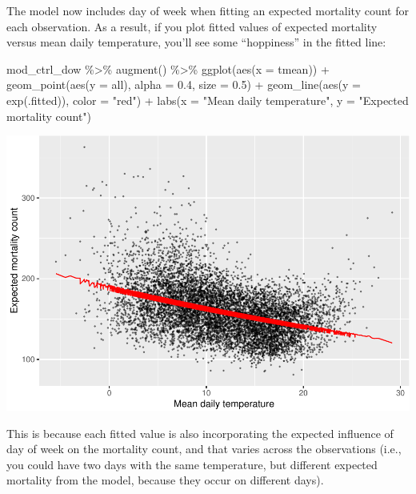 \documentclass[
]{book}
\newenvironment{Shaded}{\begin{snugshade}}{\end{snugshade}}
\newcommand{\AttributeTok}[1]{\textcolor[rgb]{0.77,0.63,0.00}{#1}}
\newcommand{\FloatTok}[1]{\textcolor[rgb]{0.00,0.00,0.81}{#1}}
\newcommand{\FunctionTok}[1]{\textcolor[rgb]{0.00,0.00,0.00}{#1}}
\newcommand{\NormalTok}[1]{#1}
\newcommand{\SpecialCharTok}[1]{\textcolor[rgb]{0.00,0.00,0.00}{#1}}
\newcommand{\StringTok}[1]{\textcolor[rgb]{0.31,0.60,0.02}{#1}}
\begin{document}
The model now includes day of week when fitting an expected mortality count
for each observation. As a result, if you plot fitted values of expected
mortality versus mean daily temperature, you'll see some ``hoppiness'' in the
fitted line:

\begin{Shaded}
\begin{Highlighting}[]
\NormalTok{mod\_ctrl\_dow }\SpecialCharTok{\%\textgreater{}\%} 
  \FunctionTok{augment}\NormalTok{() }\SpecialCharTok{\%\textgreater{}\%} 
  \FunctionTok{ggplot}\NormalTok{(}\FunctionTok{aes}\NormalTok{(}\AttributeTok{x =}\NormalTok{ tmean)) }\SpecialCharTok{+} 
  \FunctionTok{geom\_point}\NormalTok{(}\FunctionTok{aes}\NormalTok{(}\AttributeTok{y =}\NormalTok{ all), }\AttributeTok{alpha =} \FloatTok{0.4}\NormalTok{, }\AttributeTok{size =} \FloatTok{0.5}\NormalTok{) }\SpecialCharTok{+} 
  \FunctionTok{geom\_line}\NormalTok{(}\FunctionTok{aes}\NormalTok{(}\AttributeTok{y =} \FunctionTok{exp}\NormalTok{(.fitted)), }\AttributeTok{color =} \StringTok{"red"}\NormalTok{) }\SpecialCharTok{+} 
  \FunctionTok{labs}\NormalTok{(}\AttributeTok{x =} \StringTok{"Mean daily temperature"}\NormalTok{, }\AttributeTok{y =} \StringTok{"Expected mortality count"}\NormalTok{)}
\end{Highlighting}
\end{Shaded}

\includegraphics{adv_epi_analysis_files/figure-latex/unnamed-chunk-38-1.pdf}

This is because each fitted value is also incorporating the expected influence
of day of week on the mortality count, and that varies across the observations
(i.e., you could have two days with the same temperature, but different
expected mortality from the model, because they occur on different days).
\end{document}
